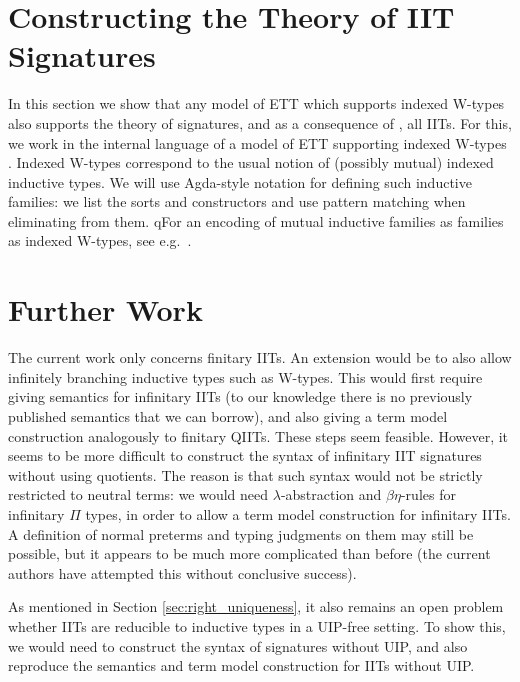 \documentclass[a4paper,UKenglish,cleveref, autoref]{lipics-v2019}
\begin{document}

\section{Constructing the Theory of IIT Signatures}
\label{sec:ambroise}

In this section we show that any model of ETT which supports indexed
W-types also supports the theory of signatures, and as a consequence
of , all IITs. For this, we work in the internal
language of a model of ETT supporting indexed W-types
\cite{indexedcont}. Indexed W-types correspond to the usual notion of
(possibly mutual) indexed inductive types. We will use Agda-style
notation for defining such inductive families: we list the sorts and
constructors and use pattern matching when eliminating from them. qFor
an encoding of mutual inductive families as families as indexed
W-types, see e.g.\ \cite{mutual}.




\section{Further Work}

The current work only concerns finitary IITs. An extension would be to also
allow infinitely branching inductive types such as W-types. This would first
require giving semantics for infinitary IITs (to our knowledge there is no
previously published semantics that we can borrow), and also giving a term model
construction analogously to finitary QIITs. These steps seem feasible. However,
it seems to be more difficult to construct the syntax of infinitary IIT
signatures without using quotients. The reason is that such syntax would not be
strictly restricted to neutral terms: we would need $\lambda$-abstraction and
$\beta\eta$-rules for infinitary $\Pi$ types, in order to allow a term model
construction for infinitary IITs. A definition of normal preterms and typing
judgments on them may still be possible, but it appears to be much more
complicated than before (the current authors have attempted this without
conclusive success).

As mentioned in Section \ref{sec:right_uniqueness}, it also remains an open
problem whether IITs are reducible to inductive types in a UIP-free setting. To
show this, we would need to construct the syntax of signatures without UIP, and
also reproduce the semantics and term model construction for IITs without UIP.





\newpage

\appendix
\end{document}
